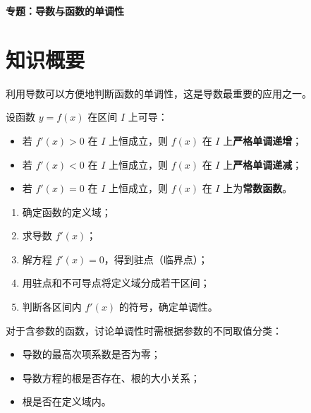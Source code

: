 \documentclass[11pt]{ctexrep}
\begin{document}
\begin{center}
    {\LARGE\bfseries 专题：导数与函数的单调性}
\end{center}

\section*{知识概要}

利用导数可以方便地判断函数的单调性，这是导数最重要的应用之一。

\begin{property}[导数与单调性的关系]
    设函数 $y = f(x)$ 在区间 $I$ 上可导：
    \begin{itemize}
        \item 若 $f'(x) > 0$ 在 $I$ 上恒成立，则 $f(x)$ 在 $I$ 上\textbf{严格单调递增}；
        \item 若 $f'(x) < 0$ 在 $I$ 上恒成立，则 $f(x)$ 在 $I$ 上\textbf{严格单调递减}；
        \item 若 $f'(x) = 0$ 在 $I$ 上恒成立，则 $f(x)$ 在 $I$ 上为\textbf{常数函数}。
    \end{itemize}
\end{property}

\begin{property}[求函数单调区间的步骤]
    \begin{enumerate}
        \item 确定函数的定义域；
        \item 求导数 $f'(x)$；
        \item 解方程 $f'(x) = 0$，得到驻点（临界点）；
        \item 用驻点和不可导点将定义域分成若干区间；
        \item 判断各区间内 $f'(x)$ 的符号，确定单调性。
    \end{enumerate}
\end{property}

\begin{property}[含参函数单调性的讨论]
    对于含参数的函数，讨论单调性时需根据参数的不同取值分类：
    \begin{itemize}
        \item 导数的最高次项系数是否为零；
        \item 导数方程的根是否存在、根的大小关系；
        \item 根是否在定义域内。
    \end{itemize}
\end{property}
\end{document}
